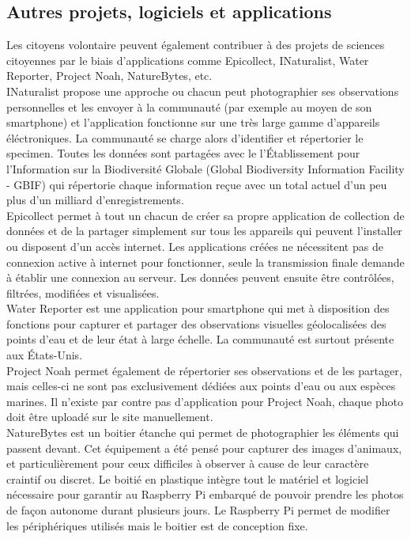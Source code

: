 \documentclass[10pt, article]{llncs}
\begin{document}
	\subsection{Autres projets, logiciels et applications}
		Les citoyens volontaire peuvent également contribuer à des projets de sciences citoyennes par le biais d'applications comme Epicollect, INaturalist, Water Reporter, Project Noah, NatureBytes, etc.\\
		INaturalist propose une approche ou chacun peut photographier ses observations personnelles et les envoyer à la communauté (par exemple au moyen de son smartphone) et l'application fonctionne sur une très large gamme d'appareils éléctroniques. La communauté se charge alors d'identifier et répertorier le specimen. Toutes les données sont partagées avec le l'Établissement pour l'Information sur la Biodiversité Globale (Global Biodiversity Information Facility - GBIF) qui répertorie chaque information reçue avec un total actuel d'un peu plus d'un milliard d'enregistrements.\\
		Epicollect permet à tout un chacun de créer sa propre application de collection de données et de la partager simplement sur tous les appareils qui peuvent l'installer ou disposent d'un accès internet. Les applications créées ne nécessitent pas de connexion active à internet pour fonctionner, seule la transmission finale demande à établir une connexion au serveur. Les données peuvent ensuite être contrôlées, filtrées, modifiées et visualisées. \\
		Water Reporter est une application pour smartphone qui met à disposition des fonctions pour capturer et partager des observations visuelles géolocalisées des points d'eau et de leur état à large échelle. La communauté est surtout présente aux États-Unis.\\
		Project Noah permet également de répertorier ses observations et de les partager, mais celles-ci ne sont pas exclusivement dédiées aux points d'eau ou aux espèces marines. Il n'existe par contre pas d'application pour Project Noah, chaque photo doit être uploadé sur le site manuellement.\\
		NatureBytes est un boitier  étanche qui permet de photographier les éléments qui passent devant. Cet équipement a été pensé pour capturer des images d'animaux, et particulièrement pour ceux difficiles à observer à cause de leur caractère craintif ou discret. Le boitié en plastique intègre tout le matériel et logiciel nécessaire pour garantir au Raspberry Pi embarqué de pouvoir prendre les photos de façon autonome durant plusieurs jours. Le Raspberry Pi permet de modifier les périphériques utilisés mais le boitier est de conception fixe.
\end{document}
